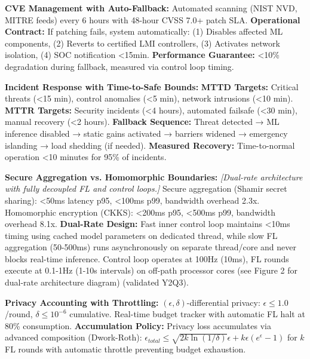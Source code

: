 \documentclass[12pt]{article}
\begin{document}
\textbf{CVE Management with Auto-Fallback:} Automated scanning (NIST NVD, MITRE feeds) every 6 hours with 48-hour CVSS 7.0+ patch SLA. \textbf{Operational Contract:} If patching fails, system automatically: (1) Disables affected ML components, (2) Reverts to certified LMI controllers, (3) Activates network isolation, (4) SOC notification <15min. \textbf{Performance Guarantee:} <10\% degradation during fallback, measured via control loop timing.

\textbf{Incident Response with Time-to-Safe Bounds:} \textbf{MTTD Targets:} Critical threats (<15 min), control anomalies (<5 min), network intrusions (<10 min). \textbf{MTTR Targets:} Security incidents (<4 hours), automated failsafe (<30 min), manual recovery (<2 hours). \textbf{Fallback Sequence:} Threat detected → ML inference disabled → static gains activated → barriers widened → emergency islanding → load shedding (if needed). \textbf{Measured Recovery:} Time-to-normal operation <10 minutes for 95\% of incidents.

\textbf{Secure Aggregation vs. Homomorphic Boundaries:} \textit{[Dual-rate architecture with fully decoupled FL and control loops.]} Secure aggregation (Shamir secret sharing): <50ms latency p95, <100ms p99, bandwidth overhead 2.3x. Homomorphic encryption (CKKS): <200ms p95, <500ms p99, bandwidth overhead 8.1x. \textbf{Dual-Rate Design:} Fast inner control loop maintains <10ms timing using cached model parameters on dedicated thread, while slow FL aggregation (50-500ms) runs asynchronously on separate thread/core and never blocks real-time inference. Control loop operates at 100Hz (10ms), FL rounds execute at 0.1-1Hz (1-10s intervals) on off-path processor cores (see Figure 2 for dual-rate architecture diagram) (validated Y2Q3).

\textbf{Privacy Accounting with Throttling:} $(\epsilon, \delta)$-differential privacy: $\epsilon \leq 1.0$/round, $\delta \leq 10^{-6}$ cumulative. Real-time budget tracker with automatic FL halt at 80\% consumption. \textbf{Accumulation Policy:} Privacy loss accumulates via advanced composition (Dwork-Roth): $\epsilon_{total} \leq \sqrt{2k\ln(1/\delta)}\epsilon + k\epsilon(e^\epsilon - 1)$ for $k$ FL rounds with automatic throttle preventing budget exhaustion.
\end{document}

